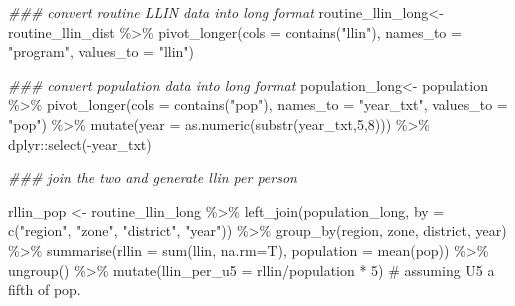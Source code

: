 \documentclass[
  letterpaper,
  DIV=11,
  numbers=noendperiod]{scrreprt}
\newenvironment{Shaded}{\begin{snugshade}}{\end{snugshade}}
\newcommand{\AttributeTok}[1]{\textcolor[rgb]{0.40,0.45,0.13}{#1}}
\newcommand{\CommentTok}[1]{\textcolor[rgb]{0.37,0.37,0.37}{#1}}
\newcommand{\DecValTok}[1]{\textcolor[rgb]{0.68,0.00,0.00}{#1}}
\newcommand{\DocumentationTok}[1]{\textcolor[rgb]{0.37,0.37,0.37}{\textit{#1}}}
\newcommand{\FunctionTok}[1]{\textcolor[rgb]{0.28,0.35,0.67}{#1}}
\newcommand{\NormalTok}[1]{\textcolor[rgb]{0.00,0.23,0.31}{#1}}
\newcommand{\OtherTok}[1]{\textcolor[rgb]{0.00,0.23,0.31}{#1}}
\newcommand{\SpecialCharTok}[1]{\textcolor[rgb]{0.37,0.37,0.37}{#1}}
\newcommand{\StringTok}[1]{\textcolor[rgb]{0.13,0.47,0.30}{#1}}
\begin{document}
\begin{Shaded}
\begin{Highlighting}[]
\DocumentationTok{\#\#\# convert routine LLIN data into long format}
\NormalTok{routine\_llin\_long}\OtherTok{\textless{}{-}}\NormalTok{ routine\_llin\_dist }\SpecialCharTok{\%\textgreater{}\%}
  \FunctionTok{pivot\_longer}\NormalTok{(}\AttributeTok{cols =} \FunctionTok{contains}\NormalTok{(}\StringTok{"llin"}\NormalTok{), }\AttributeTok{names\_to =} \StringTok{"program"}\NormalTok{, }\AttributeTok{values\_to =} \StringTok{"llin"}\NormalTok{)}

\DocumentationTok{\#\#\# convert population data into long format}
\NormalTok{population\_long}\OtherTok{\textless{}{-}}\NormalTok{ population }\SpecialCharTok{\%\textgreater{}\%}
  \FunctionTok{pivot\_longer}\NormalTok{(}\AttributeTok{cols =} \FunctionTok{contains}\NormalTok{(}\StringTok{"pop"}\NormalTok{), }\AttributeTok{names\_to =} \StringTok{"year\_txt"}\NormalTok{, }\AttributeTok{values\_to =} \StringTok{"pop"}\NormalTok{) }\SpecialCharTok{\%\textgreater{}\%}
  \FunctionTok{mutate}\NormalTok{(}\AttributeTok{year =} \FunctionTok{as.numeric}\NormalTok{(}\FunctionTok{substr}\NormalTok{(year\_txt,}\DecValTok{5}\NormalTok{,}\DecValTok{8}\NormalTok{))) }\SpecialCharTok{\%\textgreater{}\%}
\NormalTok{  dplyr}\SpecialCharTok{::}\FunctionTok{select}\NormalTok{(}\SpecialCharTok{{-}}\NormalTok{year\_txt)}


\DocumentationTok{\#\#\# join the two and generate llin per person}

\NormalTok{rllin\_pop }\OtherTok{\textless{}{-}}\NormalTok{   routine\_llin\_long }\SpecialCharTok{\%\textgreater{}\%}
  \FunctionTok{left\_join}\NormalTok{(population\_long, }\AttributeTok{by =} \FunctionTok{c}\NormalTok{(}\StringTok{"region"}\NormalTok{,}
                                    \StringTok{"zone"}\NormalTok{,}
                                    \StringTok{"district"}\NormalTok{,}
                                    \StringTok{"year"}\NormalTok{)) }\SpecialCharTok{\%\textgreater{}\%}
  \FunctionTok{group\_by}\NormalTok{(region, zone, district, year) }\SpecialCharTok{\%\textgreater{}\%}
  \FunctionTok{summarise}\NormalTok{(}\AttributeTok{rllin =} \FunctionTok{sum}\NormalTok{(llin, }\AttributeTok{na.rm=}\NormalTok{T),}
            \AttributeTok{population =} \FunctionTok{mean}\NormalTok{(pop)) }\SpecialCharTok{\%\textgreater{}\%}
  \FunctionTok{ungroup}\NormalTok{() }\SpecialCharTok{\%\textgreater{}\%}
  \FunctionTok{mutate}\NormalTok{(}\AttributeTok{llin\_per\_u5  =}\NormalTok{ rllin}\SpecialCharTok{/}\NormalTok{population }\SpecialCharTok{*} \DecValTok{5}\NormalTok{)  }\CommentTok{\# assuming U5 a fifth of pop.}
\end{Highlighting}
\end{Shaded}
\end{document}
